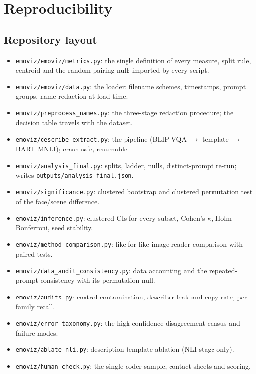 \chapter{Reproducibility}
\label{app:repro}

\begin{sloppypar}

\section{Repository layout}
\begin{itemize}\setlength{\itemsep}{1pt}
\item \texttt{emoviz/emoviz/metrics.py}: the single definition of every measure, split rule, centroid and the random-pairing null; imported by every script.
\item \texttt{emoviz/emoviz/data.py}: the loader: filename schemes, timestamps, prompt groups, name redaction at load time.
\item \texttt{emoviz/preprocess\_names.py}: the three-stage redaction procedure; the decision table travels with the dataset.
\item \texttt{emoviz/describe\_extract.py}: the pipeline (BLIP-VQA $\to$ template $\to$ BART-MNLI); crash-safe, resumable.
\item \texttt{emoviz/analysis\_final.py}: splits, ladder, nulls, distinct-prompt re-run; writes \texttt{outputs/analysis\_final.json}.
\item \texttt{emoviz/significance.py}: clustered bootstrap and clustered permutation test of the face/scene difference.
\item \texttt{emoviz/inference.py}: clustered CIs for every subset, Cohen's $\kappa$, Holm--Bonferroni, seed stability.
\item \texttt{emoviz/method\_comparison.py}: like-for-like image-reader comparison with paired tests.
\item \texttt{emoviz/data\_audit\_consistency.py}: data accounting and the repeated-prompt consistency with its permutation null.
\item \texttt{emoviz/audits.py}: control contamination, describer leak and copy rate, per-family recall.
\item \texttt{emoviz/error\_taxonomy.py}: the high-confidence disagreement census and failure modes.
\item \texttt{emoviz/ablate\_nli.py}: description-template ablation (NLI stage only).
\item \texttt{emoviz/human\_check.py}: the single-coder sample, contact sheets and scoring.

\end{itemize}
\end{sloppypar}
